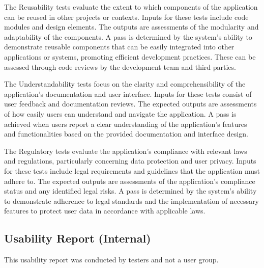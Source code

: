 \documentclass[12pt, titlepage]{article}
\begin{document}
The Reusability tests evaluate the extent to which components of the application 
can be reused in other projects or contexts. Inputs for these tests include code 
modules and design elements. The outputs are assessments of the modularity and 
adaptability of the components. A pass is determined by the system's ability to 
demonstrate reusable components that can be easily integrated into other 
applications or systems, promoting efficient development practices. These can be assessed
through code reviews by the development team and third parties.

The Understandability tests focus on the clarity and comprehensibility of the 
application's documentation and user interface. Inputs for these tests consist 
of user feedback and documentation reviews. The expected outputs are assessments 
of how easily users can understand and navigate the application. A pass is achieved 
when users report a clear understanding of the application's features and 
functionalities based on the provided documentation and interface design.

The Regulatory tests evaluate the application's compliance with relevant laws 
and regulations, particularly concerning data protection and user privacy. 
Inputs for these tests include legal requirements and guidelines that the application 
must adhere to. The expected outputs are assessments of the application's compliance 
status and any identified legal risks. A pass is determined by the system's 
ability to demonstrate adherence to legal standards and the implementation 
of necessary features to protect user data in accordance with applicable laws.

\subsection{Usability Report (Internal)}\label{sec:usability-report}

This usability report was conducted by testers and not a user group. 
\end{document}
